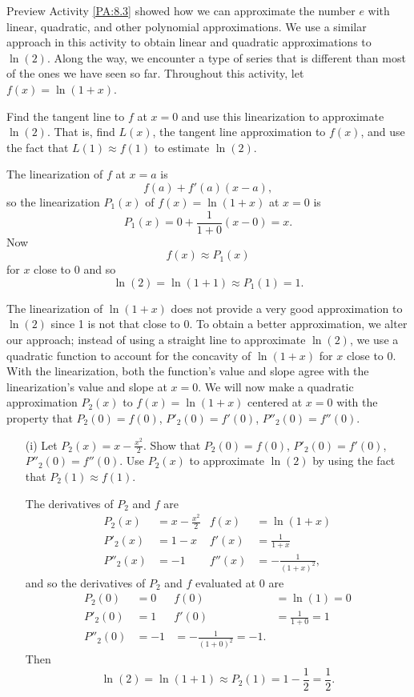 \begin{pa} \label{PA:8.4}
Preview Activity \ref{PA:8.3} showed how we can approximate the number $e$ with linear, quadratic, and other polynomial approximations. We use a similar approach in this activity to obtain linear and quadratic approximations to $\ln(2)$. Along the way, we encounter a type of series that is different than most of the ones we have seen so far. Throughout this activity, let $f(x) = \ln(1+x)$.

\ba
\item Find the tangent line to $f$ at $x=0$ and use this linearization to approximate $\ln(2)$.  That is, find $L(x)$, the tangent line approximation to $f(x)$, and use the fact that $L(1) \approx f(1)$ to estimate $\ln(2)$.

\begin{activitySolution}

The linearization of $f$ at $x=a$ is
\[f(a) + f'(a)(x-a),\]
so the linearization $P_1(x)$ of $f(x) = \ln(1+x)$ at $x=0$ is
\[P_1(x) = 0 + \frac{1}{1+0}(x-0) = x.\]
Now
\[f(x) \approx P_1(x)\]
for $x$ close to $0$ and so
\[\ln(2) = \ln(1+1) \approx P_1(1) = 1.\]

\end{activitySolution}


\item The linearization of $\ln(1+x)$ does not provide a very good approximation to $\ln(2)$ since 1 is not that close to 0. To obtain a better approximation, we alter our approach; instead of using a straight line to approximate $\ln(2)$, we use a quadratic function to account for the concavity of $\ln(1+x)$ for $x$ close to 0. With the linearization, both the function's value and slope agree with the linearization's value and slope at $x=0$. We will now make a quadratic approximation $P_2(x)$ to $f(x) = \ln(1+x)$ centered at $x=0$ with the property that $P_2(0) = f(0)$, $P'_2(0) = f'(0)$,  $P''_2(0) = f''(0)$. 
    \begin{itemize}
    \item[(i)] Let $P_2(x) =  x - \frac{x^2}{2}$. Show that $P_2(0) = f(0)$, $P'_2(0) = f'(0)$,  $P''_2(0) = f''(0)$. Use $P_2(x)$ to approximate $\ln(2)$ by using the fact that $P_2(1) \approx f(1)$.

\begin{activitySolution}

The derivatives of $P_2$ and $f$ are
\begin{align*}
P_2(x) &= x - \frac{x^2}{2} & f(x) &= \ln(1+x) \\
P'_2(x) &= 1-x & f'(x) &= \frac{1}{1+x} \\
P''_2(x) &= -1 & f''(x) &= -\frac{1}{(1+x)^2},
\end{align*}
and so the derivatives of $P_2$ and $f$ evaluated at 0 are
\begin{align*}
P_2(0) &= 0 & f(0) &= \ln(1) = 0 \\
P'_2(0) &= 1 & f'(0) &= \frac{1}{1+0} = 1 \\
P''_2(0) &= -1 &= -\frac{1}{(1+0)^2} = -1.
\end{align*}
Then
\[\ln(2) = \ln(1+1) \approx P_2(1) = 1 - \frac{1}{2} = \frac{1}{2}.\]


\end{activitySolution}
\end{itemize}
\end{pa}
